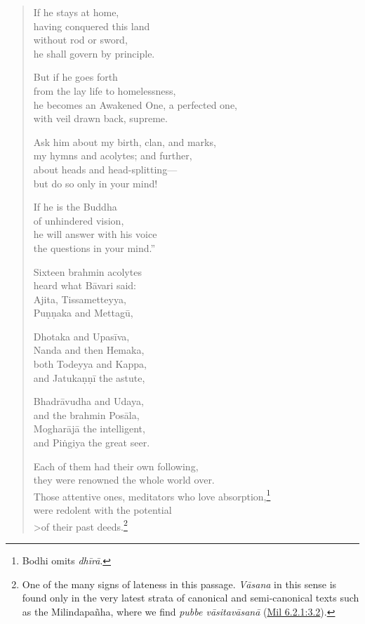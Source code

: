 \documentclass[12pt,openany]{book}%
\begin{document}
\begin{verse}
If he stays at home, \\
having conquered this land \\
without rod or sword, \\
he shall govern by principle. 

But if he goes forth \\
from the lay life to homelessness, \\
he becomes an Awakened One, a perfected one, \\
with veil drawn back, supreme. 

Ask him about my birth, clan, and marks, \\
my hymns and acolytes; and further, \\
about heads and head-splitting—\\
but do so only in your mind! 

If he is the Buddha \\
of unhindered vision, \\
he will answer with his voice \\
the questions in your mind.” 

Sixteen brahmin acolytes \\
heard what \textsanskrit{Bāvari} said: \\
Ajita, Tissametteyya, \\
\textsanskrit{Puṇṇaka} and \textsanskrit{Mettagū}, 

Dhotaka and \textsanskrit{Upasīva}, \\
Nanda and then Hemaka, \\
both Todeyya and Kappa, \\
and \textsanskrit{Jatukaṇṇī} the astute, 

\textsanskrit{Bhadrāvudha} and Udaya, \\
and the brahmin \textsanskrit{Posāla}, \\
\textsanskrit{Mogharājā} the intelligent, \\
and \textsanskrit{Piṅgiya} the great seer. 

Each of them had their own following, \\
they were renowned the whole world over. \\
Those attentive ones, meditators who love absorption,\footnote{Bodhi omits \textit{\textsanskrit{dhīrā}}. } \\
were redolent with the potential \\>of their past deeds.\footnote{One of the many signs of lateness in this passage. \textit{\textsanskrit{Vāsana}} in this sense is found only in the very latest strata of canonical and semi-canonical texts such as the \textsanskrit{Milindapañha}, where we find \textit{pubbe \textsanskrit{vāsitavāsanā}} (\href{https://suttacentral.net/mil6.2.1/en/sujato\#3.2}{Mil 6.2.1:3.2}). } 


\end{verse}
\end{document}
